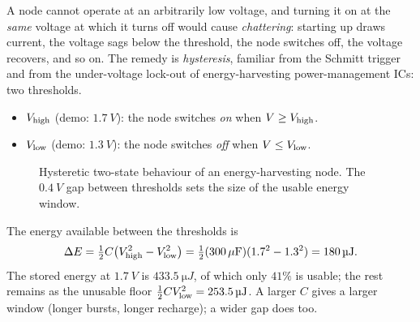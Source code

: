 A node cannot operate at an arbitrarily low voltage, and turning it on at the
\emph{same} voltage at which it turns off would cause \emph{chattering}: starting up draws current,
the voltage sags below the threshold, the node switches off, the voltage recovers, and so on. The remedy
is \emph{hysteresis}, familiar from the Schmitt trigger and from the under-voltage lock-out of
energy-harvesting power-management ICs: two thresholds.
\begin{itemize}
 \item \textbf{$V_{\mathrm{high}}$} (demo: $\SI{1.7}{V}$): the node switches \emph{on} when $V\ge V_{\mathrm{high}}$.
 \item \textbf{$V_{\mathrm{low}}$} (demo: $\SI{1.3}{V}$): the node switches \emph{off} when $V\le V_{\mathrm{low}}$.
\end{itemize}
\begin{figure}[t]
\centering
{}
\caption{Hysteretic two-state behaviour of an energy-harvesting node. The $\SI{0.4}{V}$ gap between thresholds sets the size of the usable energy window.}
\label{fig:hyst}
\end{figure}
The energy available between the thresholds is
\begin{equation}
 \Delta E=\tfrac12C\big(V_{\mathrm{high}}^2-V_{\mathrm{low}}^2\big)=\tfrac12(300\,\mu\mathrm{F})(1.7^2-1.3^2)=\SI{180}{\micro J}.
\end{equation}
The stored energy at $\SI{1.7}{V}$ is $\SI{433.5}{\micro J}$, of which only $41\%$ is usable;
the rest remains as the unusable floor $\tfrac12CV_{\mathrm{low}}^2=\SI{253.5}{\micro J}$. A
larger $C$ gives a larger window (longer bursts, longer recharge); a wider gap does too.

